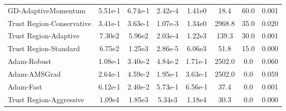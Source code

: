 \documentclass{article}
\begin{document}
\begin{table}[htbp]
{\begin{tabular}{p{2.5cm}*{7}{c}}
GD-AdaptiveMomentum & 5.51e-1 & 6.74e-1 & 2.42e-4 & 1.41e0 & 18.4 & 60.0 & 0.001 \\
Trust Region-Conservative & 3.41e-1 & 3.63e-1 & 1.07e-3 & 1.34e0 & 2968.8 & 35.0 & 0.020 \\
Trust Region-Adaptive & 7.30e2 & 5.96e2 & 2.03e-4 & 1.22e3 & 139.3 & 30.0 & 0.001 \\
Trust Region-Standard & 6.75e2 & 1.25e3 & 2.86e-5 & 6.06e3 & 51.8 & 15.0 & 0.000 \\
Adam-Robust & 1.08e-1 & 3.40e-2 & 4.84e-2 & 1.71e-1 & 2502.0 & 0.0 & 0.060 \\
Adam-AMSGrad & 2.64e-1 & 4.59e-2 & 1.95e-1 & 3.63e-1 & 2502.0 & 0.0 & 0.059 \\
Adam-Fast & 6.12e-1 & 2.40e-2 & 5.73e-1 & 6.56e-1 & 37.4 & 0.0 & 0.001 \\
Trust Region-Aggressive & 1.09e4 & 1.85e3 & 5.34e3 & 1.18e4 & 30.3 & 0.0 & 0.000 \\
\bottomrule
\end{tabular}
}
\end{table}
\end{document}

